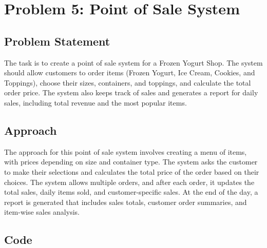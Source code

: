 \documentclass{article}
\begin{document}
\section{Problem 5: Point of Sale System}

\subsection{Problem Statement}
The task is to create a point of sale system for a Frozen Yogurt Shop. The system should allow customers to order items (Frozen Yogurt, Ice Cream, Cookies, and Toppings), choose their sizes, containers, and toppings, and calculate the total order price. The system also keeps track of sales and generates a report for daily sales, including total revenue and the most popular items.

\subsection{Approach}
The approach for this point of sale system involves creating a menu of items, with prices depending on size and container type. The system asks the customer to make their selections and calculates the total price of the order based on their choices. The system allows multiple orders, and after each order, it updates the total sales, daily items sold, and customer-specific sales. At the end of the day, a report is generated that includes sales totals, customer order summaries, and item-wise sales analysis.

\subsection{Code}
\end{document}
